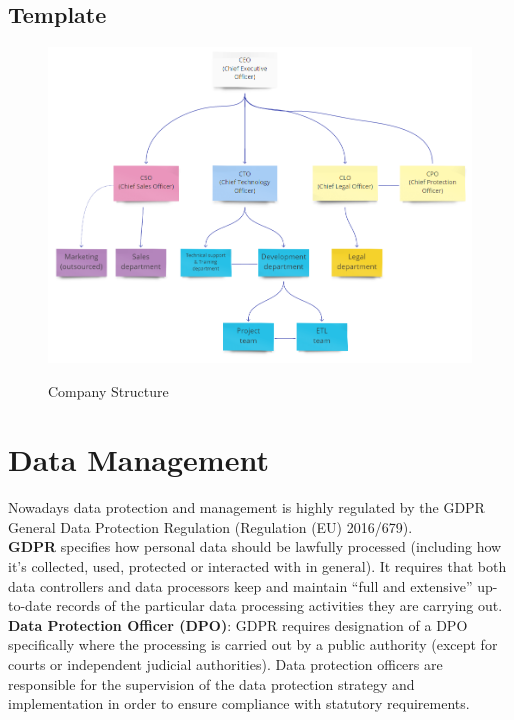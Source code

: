 \documentclass[../main.tex]{subfiles}
\begin{document}
    \subsection{Template}
    \begin{figure}[H]
        \centering
        \includegraphics[scale = 0.5]{assets/company.png} \\
        \caption[]{Company Structure}\label{fig:figure13}
    \end{figure}
    \newpage
    \section{Data Management}
    Nowadays data protection and management is highly regulated by the GDPR General Data Protection Regulation (Regulation (EU) 2016/679).\\
    \textbf{GDPR} specifies how personal data should be lawfully processed (including how it’s collected, used, protected or interacted with in general).
    It requires that both data controllers and data processors keep and maintain “full and extensive” up-to-date records of the particular data processing activities they are carrying out.\\
    \textbf{Data Protection Officer (DPO)}: GDPR requires designation of a DPO specifically where the processing is carried out by a public authority (except for courts or independent judicial authorities).
    Data protection officers are responsible for the supervision of the data protection strategy and implementation in order to ensure compliance with statutory requirements.
\end{document}
